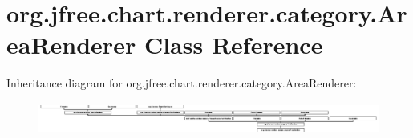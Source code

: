 \hypertarget{classorg_1_1jfree_1_1chart_1_1renderer_1_1category_1_1_area_renderer}{}\section{org.\+jfree.\+chart.\+renderer.\+category.\+Area\+Renderer Class Reference}
\label{classorg_1_1jfree_1_1chart_1_1renderer_1_1category_1_1_area_renderer}
Inheritance diagram for org.\+jfree.\+chart.\+renderer.\+category.\+Area\+Renderer\+:\begin{figure}[H]
\begin{center}
\leavevmode
\includegraphics[height=1.030928cm]{classorg_1_1jfree_1_1chart_1_1renderer_1_1category_1_1_area_renderer}
\end{center}
\end{figure}
